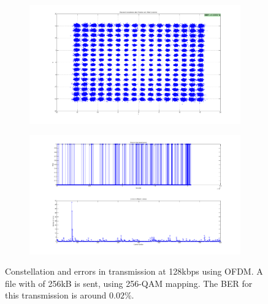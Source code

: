 \documentclass[12pt,a4paper,openright]{report}
\begin{document}
 	 \begin{figure}[H]
	 \centering
	\begin{subfigure}{1\textwidth}
	 \centering
	    \includegraphics[width=1\textwidth]{256const.png}
	    \label{fig:256const}	
	\end{subfigure}
	 \begin{subfigure}{1\textwidth}
		 \centering
		    \includegraphics[width=1\textwidth]{256errors.png}
		    \label{fig:256errors}
		    \end{subfigure}
		  
	     \caption[Constellation and errors in transmission at 128kbps using OFDM.]{Constellation and errors in transmission at 128kbps using OFDM. A file with of 256kB is sent, using 256-QAM mapping. The BER for this transmission is around $0.02\%$. }
	     \label{fig:OFDMlast1}
	 \end{figure}
	 
\end{document}
